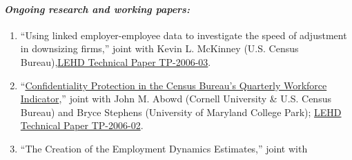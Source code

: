 \documentclass[10pt,letterpaper]{report}
\begin{document}
\paragraph{\it \bf Ongoing research and working papers:}%
\begin{enumerate}

\item ``Using linked employer-employee data to investigate the speed of
  adjustment in downsizing firms,'' joint with Kevin L. McKinney (U.S. Census Bureau),\href{http://lehd.dsd.census.gov/led/library/techpapers_2006.html}{LEHD Technical Paper TP-2006-03}.%
\item ``\href{http://http://www.vilhuber.com/lars/papers/index.php?year=2005&ser_id=2&search=multiplicative+noise&ssub=Go}{Confidentiality Protection in the Census Bureau's Quarterly Workforce
  Indicator},'' joint with {John M. Abowd}
  (Cornell University \& U.S. Census Bureau) and Bryce Stephens (University of
  Maryland College Park); \href{http://lehd.dsd.census.gov/led/library/techpapers_2006.html}{LEHD Technical Paper TP-2006-02}.%
\item ``The Creation of the Employment Dynamics Estimates,'' joint with

\end{enumerate}
\end{document}
